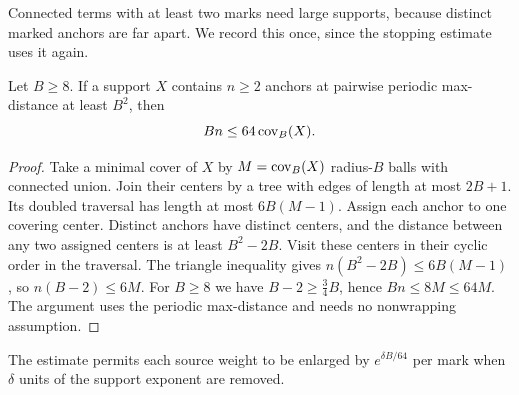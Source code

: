 Connected terms with at least two marks need large supports, because distinct marked anchors are far apart. We record this once, since the stopping estimate uses it again.
\begin{lemma}\label{lem:E-cover}
Let $B\ge8$. If a support $X$ contains $n\ge2$ anchors at pairwise periodic max-distance at least $B^2$, then
\begin{equation}\label{eq:E-marked-cover}
 Bn\le64\operatorname{cov}_{B}(X).
\end{equation}
\end{lemma}
\begin{proof}
Take a minimal cover of $X$ by $M=\operatorname{cov}_B(X)$ radius-$B$ balls with connected union. Join their centers by a tree with edges of length at most $2B+1$. Its doubled traversal has length at most $6B(M-1)$. Assign each anchor to one covering center. Distinct anchors have distinct centers, and the distance between any two assigned centers is at least $B^2-2B$. Visit these centers in their cyclic order in the traversal. The triangle inequality gives $n(B^2-2B)\le6B(M-1)$, so $n(B-2)\le6M$. For $B\ge8$ we have $B-2\ge\tfrac34B$, hence $Bn\le8M\le64M$. The argument uses the periodic max-distance and needs no nonwrapping assumption.
\end{proof}
The estimate permits each source weight to be enlarged by $e^{\delta B/64}$ per mark when $\delta$ units of the support exponent are removed.

